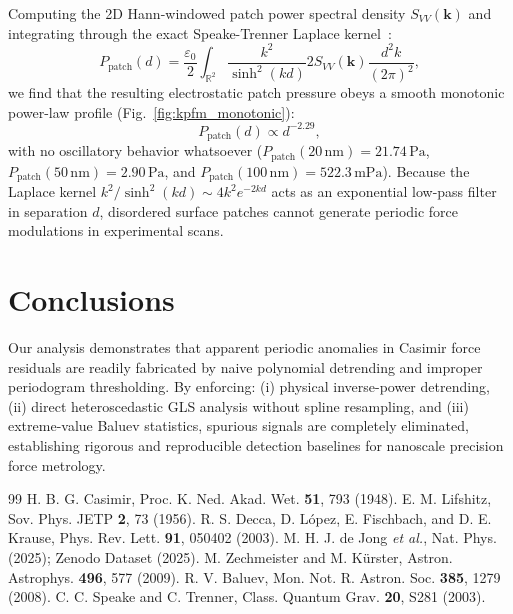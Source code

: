 \documentclass[10pt,twocolumn,a4paper]{article}
\begin{document}
Computing the 2D Hann-windowed patch power spectral density $S_{VV}(\mathbf{k})$ and integrating through the exact Speake-Trenner Laplace kernel~\cite{speake2003}:
\begin{equation}
P_{\mathrm{patch}}(d) = \frac{\varepsilon_0}{2} \int_{\mathbb{R}^2} \frac{k^2}{\sinh^2(kd)} 2 S_{VV}(\mathbf{k}) \frac{d^2k}{(2\pi)^2},
\label{eq:speake}
\end{equation}
we find that the resulting electrostatic patch pressure obeys a smooth monotonic power-law profile (Fig.~\ref{fig:kpfm_monotonic}):
\begin{equation}
P_{\mathrm{patch}}(d) \propto d^{-2.29},
\end{equation}
with no oscillatory behavior whatsoever ($P_{\mathrm{patch}}(20\,\mathrm{nm}) = 21.74\,\mathrm{Pa}$, $P_{\mathrm{patch}}(50\,\mathrm{nm}) = 2.90\,\mathrm{Pa}$, and $P_{\mathrm{patch}}(100\,\mathrm{nm}) = 522.3\,\mathrm{mPa}$). Because the Laplace kernel $k^2/\sinh^2(kd) \sim 4k^2 e^{-2kd}$ acts as an exponential low-pass filter in separation $d$, disordered surface patches cannot generate periodic force modulations in experimental scans.

\section{Conclusions}
Our analysis demonstrates that apparent periodic anomalies in Casimir force residuals are readily fabricated by naive polynomial detrending and improper periodogram thresholding. By enforcing: (i) physical inverse-power detrending, (ii) direct heteroscedastic GLS analysis without spline resampling, and (iii) extreme-value Baluev statistics, spurious signals are completely eliminated, establishing rigorous and reproducible detection baselines for nanoscale precision force metrology.

\begin{thebibliography}{99}
 H. B. G. Casimir, Proc. K. Ned. Akad. Wet. \textbf{51}, 793 (1948).
 E. M. Lifshitz, Sov. Phys. JETP \textbf{2}, 73 (1956).
 R. S. Decca, D. L\'opez, E. Fischbach, and D. E. Krause, Phys. Rev. Lett. \textbf{91}, 050402 (2003).
 M. H. J. de Jong \textit{et al.}, Nat. Phys. (2025); Zenodo Dataset (2025).
 M. Zechmeister and M. K\"urster, Astron. Astrophys. \textbf{496}, 577 (2009).
 R. V. Baluev, Mon. Not. R. Astron. Soc. \textbf{385}, 1279 (2008).
 C. C. Speake and C. Trenner, Class. Quantum Grav. \textbf{20}, S281 (2003).
\end{thebibliography}
\end{document}
